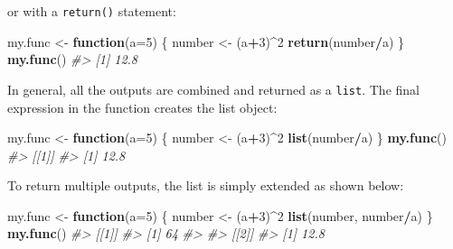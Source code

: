 \documentclass[
]{book}
\newenvironment{Shaded}{\begin{snugshade}}{\end{snugshade}}
\newcommand{\AttributeTok}[1]{\textcolor[rgb]{0.13,0.29,0.53}{#1}}
\newcommand{\CommentTok}[1]{\textcolor[rgb]{0.56,0.35,0.01}{\textit{#1}}}
\newcommand{\ControlFlowTok}[1]{\textcolor[rgb]{0.13,0.29,0.53}{\textbf{#1}}}
\newcommand{\DecValTok}[1]{\textcolor[rgb]{0.00,0.00,0.81}{#1}}
\newcommand{\FunctionTok}[1]{\textcolor[rgb]{0.13,0.29,0.53}{\textbf{#1}}}
\newcommand{\NormalTok}[1]{#1}
\newcommand{\OtherTok}[1]{\textcolor[rgb]{0.56,0.35,0.01}{#1}}
\newcommand{\SpecialCharTok}[1]{\textcolor[rgb]{0.81,0.36,0.00}{\textbf{#1}}}
\begin{document}
or with a \texttt{return()} statement:

\begin{Shaded}
\begin{Highlighting}[]
\NormalTok{my.func }\OtherTok{\textless{}{-}} \ControlFlowTok{function}\NormalTok{(}\AttributeTok{a=}\DecValTok{5}\NormalTok{)}
\NormalTok{  \{  number }\OtherTok{\textless{}{-}}\NormalTok{ (a}\SpecialCharTok{+}\DecValTok{3}\NormalTok{)}\SpecialCharTok{\^{}}\DecValTok{2}
     \FunctionTok{return}\NormalTok{(number}\SpecialCharTok{/}\NormalTok{a)}
\NormalTok{  \}}
\FunctionTok{my.func}\NormalTok{()}
\CommentTok{\#\textgreater{} [1] 12.8}
\end{Highlighting}
\end{Shaded}

In general, all the outputs are combined and returned as a \texttt{list}. The final expression in the function creates the list object:

\begin{Shaded}
\begin{Highlighting}[]
\NormalTok{my.func }\OtherTok{\textless{}{-}} \ControlFlowTok{function}\NormalTok{(}\AttributeTok{a=}\DecValTok{5}\NormalTok{)}
\NormalTok{  \{  number }\OtherTok{\textless{}{-}}\NormalTok{ (a}\SpecialCharTok{+}\DecValTok{3}\NormalTok{)}\SpecialCharTok{\^{}}\DecValTok{2}
     \FunctionTok{list}\NormalTok{(number}\SpecialCharTok{/}\NormalTok{a)}
\NormalTok{  \}}
\FunctionTok{my.func}\NormalTok{()}
\CommentTok{\#\textgreater{} [[1]]}
\CommentTok{\#\textgreater{} [1] 12.8}
\end{Highlighting}
\end{Shaded}

To return multiple outputs, the list is simply extended as shown below:

\begin{Shaded}
\begin{Highlighting}[]
\NormalTok{my.func }\OtherTok{\textless{}{-}} \ControlFlowTok{function}\NormalTok{(}\AttributeTok{a=}\DecValTok{5}\NormalTok{)}
\NormalTok{  \{  number }\OtherTok{\textless{}{-}}\NormalTok{ (a}\SpecialCharTok{+}\DecValTok{3}\NormalTok{)}\SpecialCharTok{\^{}}\DecValTok{2}
     \FunctionTok{list}\NormalTok{(number, number}\SpecialCharTok{/}\NormalTok{a)}
\NormalTok{  \}}
\FunctionTok{my.func}\NormalTok{()}
\CommentTok{\#\textgreater{} [[1]]}
\CommentTok{\#\textgreater{} [1] 64}
\CommentTok{\#\textgreater{} }
\CommentTok{\#\textgreater{} [[2]]}
\CommentTok{\#\textgreater{} [1] 12.8}
\end{Highlighting}
\end{Shaded}
\end{document}
